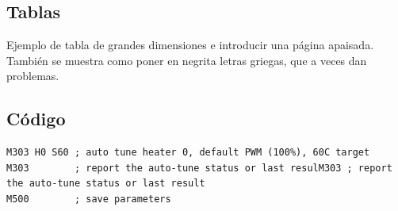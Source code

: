 
\subsection{Tablas}

Ejemplo de tabla de grandes dimensiones e introducir una página apaisada. También se muestra como poner en negrita letras griegas, que a veces dan problemas.

\begin{landscape}
    \vspace*{\fill}
    
    \vspace*{\fill}
    \clearpage
\end{landscape}



\subsection{Código}


\begin{lstlisting}
M303 H0 S60 ; auto tune heater 0, default PWM (100%), 60C target
M303        ; report the auto-tune status or last resulM303 ; report the auto-tune status or last result
M500        ; save parameters
\end{lstlisting}




